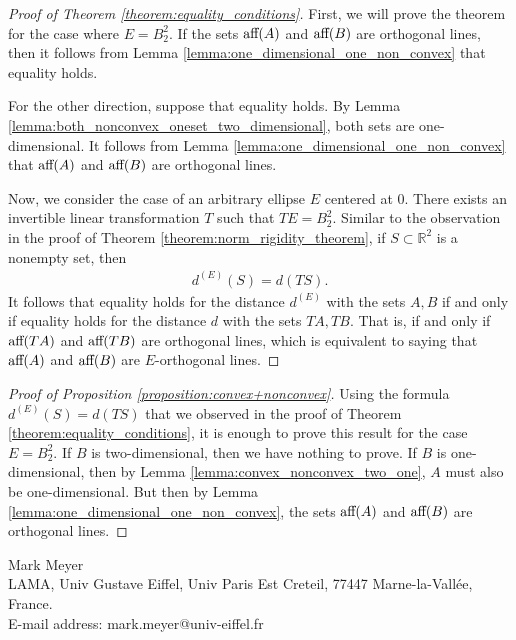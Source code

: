 \documentclass[11pt]{article}
\begin{document}
\begin{proof}[Proof of Theorem \ref{theorem:equality_conditions}]

First, we will prove the theorem for the case where $E=B_2^2$. If the sets $\textup{aff}(A)$ and $\textup{aff}(B)$ are orthogonal lines, then it follows from Lemma \ref{lemma:one_dimensional_one_non_convex} that equality holds. 

For the other direction, suppose that equality holds. By Lemma \ref{lemma:both_nonconvex_oneset_two_dimensional}, both sets are one-dimensional. It follows from Lemma \ref{lemma:one_dimensional_one_non_convex} that $\textup{aff}(A)$ and $\textup{aff}(B)$ are orthogonal lines. 

Now, we consider the case of an arbitrary ellipse $E$ centered at $0$. There exists an invertible linear transformation $T$ such that $TE=B_2^2$. Similar to the observation in the proof of Theorem \ref{theorem:norm_rigidity_theorem}, if $S\subset\mathbb{R}^2$ is a nonempty set, then
\begin{align*}
    d^{(E)}(S)=d(TS).
\end{align*}
It follows that equality holds for the distance $d^{(E)}$ with the sets $A,B$ if and only if equality holds for the distance $d$ with the sets $TA,TB$. That is, if and only if $\textup{aff}(TA)$ and $\textup{aff}(TB)$ are orthogonal lines, which is equivalent to saying that $\textup{aff}(A)$ and $\textup{aff}(B)$ are $E$-orthogonal lines.
\end{proof}

\begin{proof}[Proof of Proposition \ref{proposition:convex+nonconvex}]
    Using the formula $d^{(E)}(S)=d(TS)$ that we observed in the proof of Theorem \ref{theorem:equality_conditions}, it is enough to prove this result for the case $E=B_2^2$. If $B$ is two-dimensional, then we have nothing to prove. If $B$ is one-dimensional, then by Lemma \ref{lemma:convex_nonconvex_two_one}, $A$ must also be one-dimensional. But then by Lemma \ref{lemma:one_dimensional_one_non_convex}, the sets $\textup{aff}(A)$ and $\textup{aff}(B)$ are orthogonal lines. 
\end{proof}

\newpage



\bigskip
\noindent Mark Meyer
\\
LAMA, Univ Gustave Eiffel, Univ Paris Est Creteil, 77447 Marne-la-Vall\'ee, France.
\\
E-mail address: mark.meyer@univ-eiffel.fr
\vspace{2mm}
\\
\end{document}
